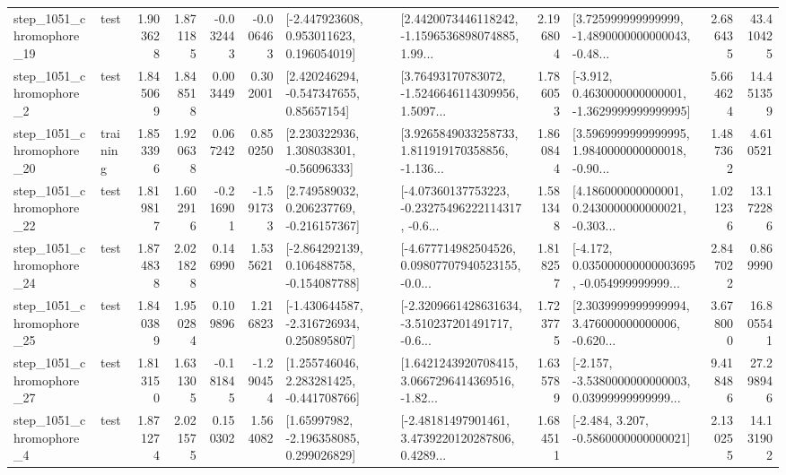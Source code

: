 \begin{tabular}{llrrrrllrlrr}
 step\_1051\_chromophore\_19 &      test &      1.903628 &    1.871185 &     -0.032443 & -0.006463 &    [-2.447923608, 0.953011623, 0.196054019] &  [2.4420073446118242, -1.1596536898074885, 1.99... &       2.196804 &  [3.725999999999999, -1.4890000000000043, -0.48... &            2.686435 &         43.410425 \\
  step\_1051\_chromophore\_2 &      test &      1.845069 &    1.848518 &      0.003449 &  0.302001 &     [2.420246294, -0.547347655, 0.85657154] &  [3.76493170783072, -1.5246646114309956, 1.5097... &       1.786053 &  [-3.912, 0.4630000000000001, -1.3629999999999995] &            5.664624 &         14.451359 \\
 step\_1051\_chromophore\_20 &  training &      1.853396 &    1.920638 &      0.067242 &  0.850250 &     [2.230322936, 1.308038301, -0.56096333] &  [3.9265849033258733, 1.811919170358856, -1.136... &       1.860844 &  [3.5969999999999995, 1.9840000000000018, -0.90... &            1.487362 &          4.610521 \\
 step\_1051\_chromophore\_22 &      test &      1.819817 &    1.602916 &     -0.216901 & -1.591733 &    [2.749589032, 0.206237769, -0.216157367] &  [-4.07360137753223, -0.23275496222114317, -0.6... &       1.581348 &  [4.186000000000001, 0.2430000000000021, -0.303... &            1.021236 &         13.172286 \\
 step\_1051\_chromophore\_24 &      test &      1.874838 &    2.021828 &      0.146990 &  1.535621 &   [-2.864292139, 0.106488758, -0.154087788] &  [-4.677714982504526, 0.09807707940523155, -0.0... &       1.818257 &  [-4.172, 0.035000000000003695, -0.054999999999... &            2.847022 &          0.869990 \\
 step\_1051\_chromophore\_25 &      test &      1.840389 &    1.950284 &      0.109896 &  1.216823 &   [-1.430644587, -2.316726934, 0.250895807] &  [-2.3209661428631634, -3.510237201491717, -0.6... &       1.723775 &  [2.3039999999999994, 3.476000000000006, -0.620... &            3.678000 &         16.805541 \\
 step\_1051\_chromophore\_27 &      test &      1.813150 &    1.631305 &     -0.181845 & -1.290454 &    [1.255746046, 2.283281425, -0.441708766] &  [1.6421243920708415, 3.0667296414369516, -1.82... &       1.635789 &  [-2.157, -3.5380000000000003, 0.03999999999999... &            9.418486 &         27.298946 \\
  step\_1051\_chromophore\_4 &      test &      1.871274 &    2.021575 &      0.150302 &  1.564082 &     [1.65997982, -2.196358085, 0.299026829] &  [-2.48181497901461, 3.4739220120287806, 0.4289... &       1.684511 &               [-2.484, 3.207, -0.5860000000000021] &            2.130255 &         14.131902 \\

\end{tabular}
